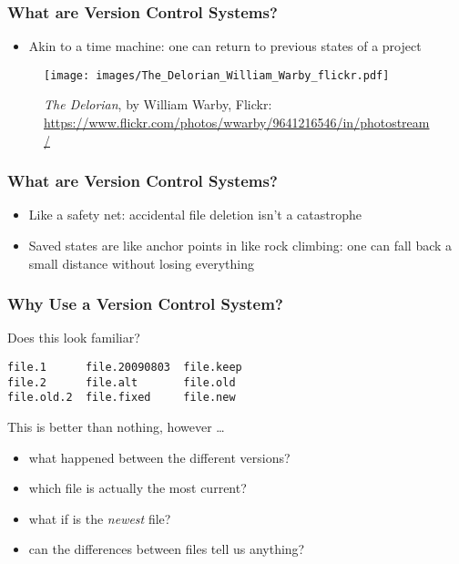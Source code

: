\documentclass{git_course}
\begin{document}
\begin{frame}[fragile]
\frametitle{What are Version Control Systems?}
\begin{itemize}
    \item Akin to a time machine: one can return to previous states of a
        project
\end{itemize}
\begin{figure}
    \centerline{%
    \texttt{[image: images/The\_Delorian\_William\_Warby\_flickr.pdf]}}
        \caption{\tiny \emph{The Delorian}, by William Warby, Flickr:
    \url{https://www.flickr.com/photos/wwarby/9641216546/in/photostream/}}
\end{figure}
\end{frame}

\begin{frame}
\frametitle{What are Version Control Systems?}
\begin{itemize}
    \item Like a safety net: accidental file deletion isn't a catastrophe
    \item Saved states are like anchor points in like rock climbing:
        one can fall back a small distance without losing everything
\end{itemize}
\end{frame}

\begin{frame}[fragile]
\frametitle{Why Use a Version Control System?}

Does this look familiar?

\begin{lstlisting}
file.1      file.20090803  file.keep
file.2      file.alt       file.old
file.old.2  file.fixed     file.new
\end{lstlisting}

This is better than nothing, however \ldots
\begin{itemize}
    \item what happened between the different versions?
    \item which file is actually the most current?
    \item what if  is the \emph{newest} file?
    \item can the differences between files tell us anything?
\end{itemize}
\end{frame}
\end{document}

